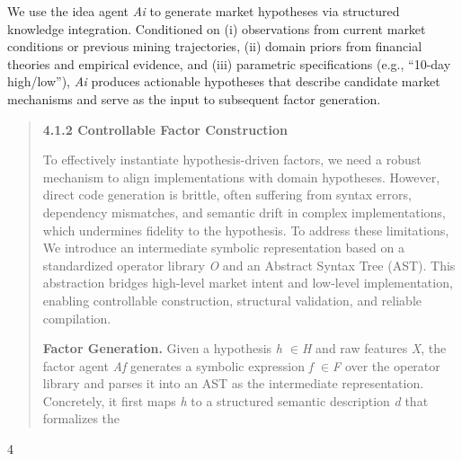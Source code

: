 \documentclass[
]{article}
\begin{document}
We use the idea agent \emph{Ai} to generate market hypotheses via
structured knowledge integration. Conditioned on (i) observations from
current market conditions or previous mining trajectories, (ii) domain
priors from financial theories and empirical evidence, and (iii)
parametric specifications (e.g., ``10-day high/low''), \emph{Ai}
produces actionable hypotheses that describe candidate market mechanisms
and serve as the input to subsequent factor generation.

\begin{quote}
\textbf{4.1.2 Controllable Factor Construction}

To effectively instantiate hypothesis-driven factors, we need a robust
mechanism to align implementations with domain hypotheses. However,
direct code generation is brittle, often suffering from syntax errors,
dependency mismatches, and semantic drift in complex implementations,
which undermines fidelity to the hypothesis. To address these
limitations, We introduce an intermediate symbolic representation based
on a standardized operator library \emph{O} and an Abstract Syntax Tree
(AST). This abstraction bridges high-level market intent and low-level
implementation, enabling controllable construction, structural
validation, and reliable compilation.

\textbf{Factor Generation.} Given a hypothesis \emph{h $\in$H} and raw
features \emph{X}, the factor agent \emph{Af} generates a symbolic
expression \emph{f $\in$F} over the operator library and parses it into an
AST as the intermediate representation. Concretely, it first maps
\emph{h} to a structured semantic description \emph{d} that formalizes
the
\end{quote}

4
\end{document}
